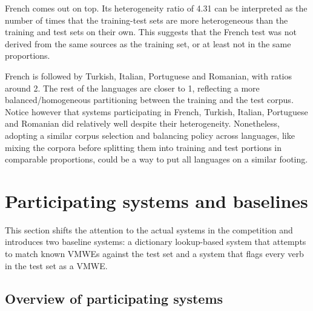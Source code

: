 \documentclass[output=paper
,modfonts
,nonflat,draftmode]{langsci/langscibook}
\begin{document}
French comes out on top. Its heterogeneity ratio of 4.31 can be interpreted as the number of times that the training-test sets are more heterogeneous than the training and test sets on their own. This suggests that the French test was not derived from the same sources as the training set, or at least not in the same proportions.

French is followed by Turkish, Italian, Portuguese and Romanian, with ratios around 2. The rest of the languages are closer to 1, reflecting a more balanced/homogeneous partitioning between the training and the test corpus. Notice however that systems participating in French, Turkish, Italian, Portuguese and Romanian did relatively well despite their heterogeneity. Nonetheless, adopting a similar corpus selection and balancing policy across languages, like mixing the corpora before splitting them into training and test portions in comparable proportions, could be a way to put all languages on a similar footing.


\begin{comment}
Points to cover:
* New vs "seen" VMWEs - concept and method of detecting them
* Graph comparing systems and baselines performance on shared task against proportion of "seen" VMWEs (like the one in my poster)
* Evaluation on new VMWEs only: graph comparing systems and baselines 
* Discussion/Analysis of results - which approaches seem to be better at detecting new VMWEs? 
\end{comment}

\section{\label{sec:systems}Participating systems and baselines}

\begin{comment}
Points to cover (re-organised as per Behrang's feeback):
* An overview of the approaches used in participating systems
* Participating systems results
* Baselines description
* Graph comparing systems and baselines performance on shared task
\end{comment}

This section shifts the attention to the actual systems in the competition and introduces two baseline systems: a dictionary lookup-based system that attempts to match known VMWEs against the test set and a system that flags every verb in the test set as a VMWE.

\subsection{Overview of participating systems}
\end{document}
